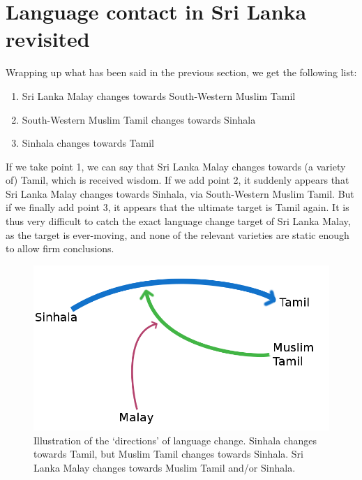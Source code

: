 \documentclass{article}
\begin{document}
\section{Language contact in Sri Lanka revisited}\label{sec:languagecontact}
Wrapping up what has been said in the previous section, we get the following list:

\begin{enumerate}
 \item Sri Lanka Malay changes towards South-Western Muslim Tamil 
 \item South-Western Muslim Tamil changes towards Sinhala
 \item Sinhala changes towards Tamil 
\end{enumerate}

If we take point 1, we can say that Sri Lanka Malay changes towards (a variety of) Tamil, which is received wisdom. If we add point 2, it suddenly appears that Sri Lanka Malay changes towards Sinhala, via South-Western Muslim Tamil. But if we finally add point 3, it appears that the ultimate target is Tamil again. It is thus very difficult to catch the exact language change target of Sri Lanka Malay, as the target is ever-moving, and none of the relevant varieties are static enough to allow firm conclusions. 


\begin{figure}
 \includegraphics[height=.4\textheight]{changingdirections.png}
\caption{Illustration of the `directions' of language change. Sinhala changes towards Tamil, but Muslim Tamil changes towards Sinhala. Sri Lanka Malay changes towards Muslim Tamil and/or Sinhala.}
\end{figure}
\end{document}
